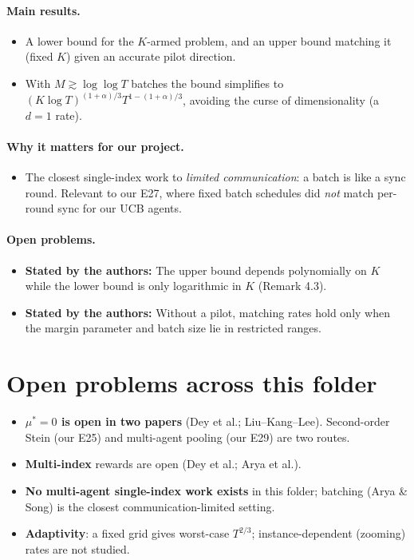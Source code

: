 \documentclass[11pt]{article}
\newcommand{\stated}{\textcolor{green!40!black}{\textbf{Stated by the authors:}}}
\begin{document}
\paragraph{Main results.}
\begin{itemize}\item A lower bound for the $K$-armed problem, and an upper bound matching it (fixed $K$) given an accurate pilot direction.\item With $M\gtrsim\log\log T$ batches the bound simplifies to $(K\log T)^{(1+\alpha)/3}T^{1-(1+\alpha)/3}$, avoiding the curse of dimensionality (a $d=1$ rate).\end{itemize}
\paragraph{Why it matters for our project.}
\begin{itemize}\item The closest single-index work to \emph{limited communication}: a batch is like a sync round. Relevant to our E27, where fixed batch schedules did \emph{not} match per-round sync for our UCB agents.\end{itemize}
\paragraph{Open problems.}
\begin{itemize}\item \stated{} The upper bound depends polynomially on $K$ while the lower bound is only logarithmic in $K$ (Remark 4.3).\item \stated{} Without a pilot, matching rates hold only when the margin parameter and batch size lie in restricted ranges.\end{itemize}
\section{Open problems across this folder}
\begin{itemize}\item \textbf{$\mu^*=0$ is open in two papers} (Dey et al.; Liu--Kang--Lee). Second-order Stein (our E25) and multi-agent pooling (our E29) are two routes.\item \textbf{Multi-index} rewards are open (Dey et al.; Arya et al.).\item \textbf{No multi-agent single-index work exists} in this folder; batching (Arya \& Song) is the closest communication-limited setting.\item \textbf{Adaptivity}: a fixed grid gives worst-case $T^{2/3}$; instance-dependent (zooming) rates are not studied.\end{itemize}
\end{document}
